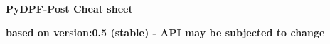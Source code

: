 \documentclass[9pt,landscape]{article}
\begin{document}
\raggedright
\footnotesize

\begin{center}
     \Huge{\textbf{PyDPF-Post Cheat sheet}} \\
\end{center}

\begin{center}
  \small{\textbf{based on version:0.5 (stable) - API may be subjected to change}} \\
\end{center}

\vspace{-0.15cm}
\noindent\makebox[\linewidth]{\rule{\paperwidth}{2pt}}
\end{document}

